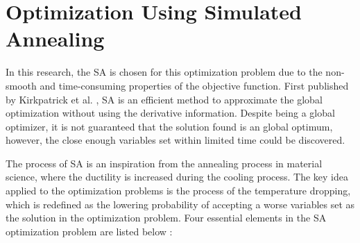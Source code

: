 \section{Optimization Using Simulated Annealing}
\label{sec:simAnneal}


In this research, the \ac{SA} is chosen for this optimization problem due to the non-smooth and time-consuming properties of the objective function. First published by Kirkpatrick et al. \cite{Kirkpatrick1983}, \ac{SA} is an efficient method to approximate the global optimization without using the derivative information. Despite being a global optimizer, it is not guaranteed that the solution found is an global optimum, however, the close enough variables set within limited time could be discovered.

The process of \ac{SA} is an inspiration from the annealing process in material science, where the ductility is increased during the cooling process. The key idea applied to the optimization problems is the process of the temperature dropping, which is redefined as the lowering probability of accepting a worse variables set as the solution in the optimization problem. Four essential elements in the \ac{SA} optimization problem are listed below :

